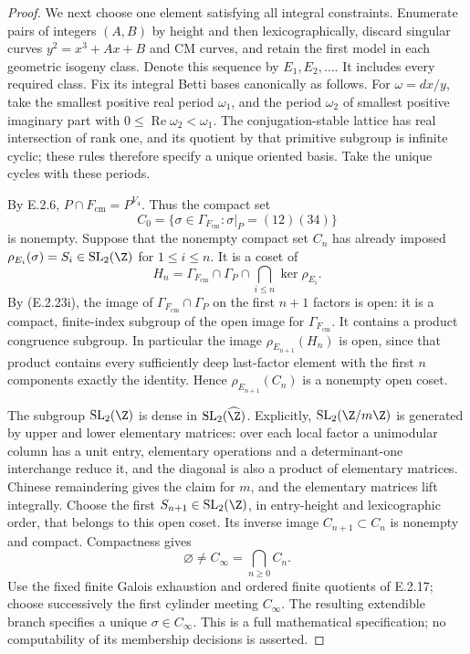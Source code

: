 \begin{proof}
We next choose one element satisfying all integral constraints.
Enumerate pairs of integers \((A,B)\) by height and then
lexicographically, discard singular curves
\(y^2=x^3+Ax+B\) and CM curves, and retain the first model
in each geometric isogeny class. Denote this sequence by
\(E_1,E_2,\ldots\). It includes every required class.
Fix its integral Betti bases canonically as follows. For
\(\omega=dx/y\), take the smallest positive real period
\(\omega_1\), and the period \(\omega_2\) of smallest
positive imaginary part with
\(0\leq\operatorname{Re}\omega_2<\omega_1\).
The conjugation-stable lattice has real intersection of
rank one, and its quotient by that primitive subgroup is
infinite cyclic; these rules therefore specify a unique
oriented basis. Take the unique cycles with these periods.

By E.2.6, \(P\cap F_{\mathrm{cm}}=P^{V_4}\).
Thus the compact set
\[
 C_0=\{\sigma\in\Gamma_{F_{\mathrm{cm}}}:
                    \sigma|_P=(12)(34)\}
\]
is nonempty. Suppose that the nonempty compact set \(C_n\)
has already imposed
\(\rho_{E_i}(\sigma)=S_i\in\operatorname{SL}_2(\Z)\)
for \(1\leq i\leq n\). It is a coset of
\[
 H_n=\Gamma_{F_{\mathrm{cm}}}\cap\Gamma_P
                      \cap\bigcap_{i\leq n}\ker\rho_{E_i}.
 \tag{E.2.23j}
\]
By (E.2.23i), the image of
\(\Gamma_{F_{\mathrm{cm}}}\cap\Gamma_P\) on the first
\(n+1\) factors is open: it is a compact, finite-index
subgroup of the open image for \(\Gamma_{F_{\mathrm{cm}}}\).
It contains a product congruence subgroup. In particular the
image \(\rho_{E_{n+1}}(H_n)\) is open, since that product
contains every sufficiently deep last-factor element with
the first \(n\) components exactly the identity.
Hence \(\rho_{E_{n+1}}(C_n)\) is a nonempty open coset.

The subgroup \(\operatorname{SL}_2(\Z)\) is dense in
\(\operatorname{SL}_2(\widehat\Z)\). Explicitly,
\(\operatorname{SL}_2(\Z/m\Z)\) is generated by upper
and lower elementary matrices: over each local factor a
unimodular column has a unit entry, elementary operations
and a determinant-one interchange reduce it, and the
diagonal is also a product of elementary matrices.
Chinese remaindering gives the claim for \(m\), and the
elementary matrices lift integrally. Choose the first
\(S_{n+1}\in\operatorname{SL}_2(\Z)\), in entry-height
and lexicographic order, that belongs to this open coset.
Its inverse image \(C_{n+1}\subset C_n\) is nonempty
and compact. Compactness gives
\[
 \varnothing\ne C_\infty=\bigcap_{n\geq0}C_n.
 \tag{E.2.23k}
\]
Use the fixed finite Galois exhaustion and ordered finite
quotients of E.2.17; choose successively the first cylinder
meeting \(C_\infty\). The resulting extendible branch
specifies a unique \(\sigma\in C_\infty\).
This is a full mathematical specification; no computability
of its membership decisions is asserted.


\end{proof}
